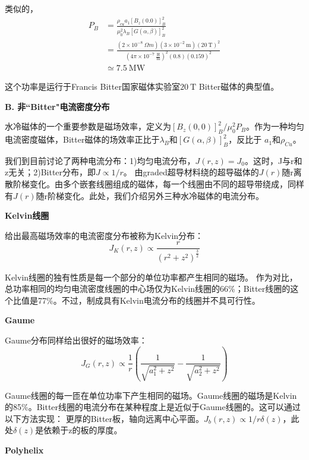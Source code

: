 类似的，
\begin{equation*}
\begin{split}
P_B&=\frac{\rho_{cu}a_1[B_z(0.0)]_B^2}{\mu_0^2\lambda_B[G(\alpha,\beta)]_B^2}\\
&=\frac{(2\times 10^{-8}\ \Omega m)(3\times 10^{-2}\ \mathrm{m})(20\ \mathrm{T})^2}{(4\pi\times 10^{-7}\ \mathrm{\frac{H}{m}})^2(0.8)(0.159)^2}\\
&\simeq 7.5\ \mathrm{MW}%
\end{split}
\end{equation*}

这个功率是运行于Francis Bitter国家磁体实验室$20\ \mathrm{T}$ Bitter磁体的典型值。

\textbf{B. 非``Bitter"电流密度分布}

水冷磁体的一个重要参数是磁场效率，定义为$[B_z(0,0)]_B^2/\mu_0^2 P_B$。作为一种均匀电流密度磁体，Bitter磁体的场效率正比于$\lambda_B$和$[G(\alpha,\beta)]_B^2$，反比于
$a_1$和$\rho_{Cu}$。

我们到目前讨论了两种电流分布：1)均匀电流分布，$J(r,z)=J_0$。这时，J与r和z无关；2)Bitter分布，即$J\propto 1/r$。
由graded超导材料绕的超导磁体的$J(r)$随r离散阶梯变化。由多个嵌套线圈组成的磁体，每一个线圈由不同的超导带绕成，同样有$J(r)$随r阶梯变化。此处，我们介绍另外三种水冷磁体的电流分布。

\textbf{Kelvin线圈}

给出最高磁场效率的电流密度分布被称为Kelvin分布：
\begin{equation*}
J_K(r,z)\propto\frac{r}{(r^2+z^2)^\frac{3}{2}}%
\end{equation*}

Kelvin线圈的独有性质是每一个部分的单位功率都产生相同的磁场。
作为对比，总功率相同的均匀电流密度线圈的中心场仅为Kelvin线圈的66\%；Bitter线圈的这个比值是77\%。不过，制成具有Kelvin电流分布的线圈并不具可行性。

\textbf{Gaume}

Gaume分布同样给出很好的磁场效率：
\begin{equation*}
J_G(r,z)\propto\frac{1}{r}\left(\frac{1}{\sqrt{a_1^2+z^2}}-\frac{1}{\sqrt{a_2^2+z^2}}\right)%
\end{equation*}

Gaume线圈的每一匝在单位功率下产生相同的磁场。Gaume线圈的磁场是Kelvin的85\%。Bitter线圈的电流分布在某种程度上是近似于Gaume线圈的。这可以通过以下方法实现：
更厚的Bitter板，轴向远离中心平面。$J_b(r,z)\propto 1/r\delta(z)$，此处$\delta(z)$是依赖于z的板的厚度。

\textbf{Polyhelix}


